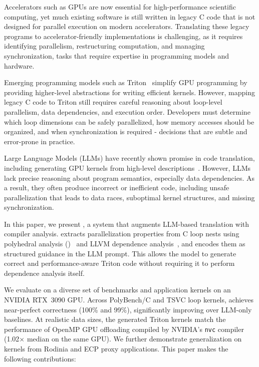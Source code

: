 \documentclass[sigconf]{acmart}
\begin{document}
Accelerators such as GPUs are now essential for high-performance scientific computing, yet much existing software is still written in legacy C code that is not designed for parallel execution on modern accelerators. Translating these legacy programs to accelerator-friendly implementations is challenging, as it requires identifying parallelism, restructuring computation, and managing synchronization, tasks that require expertise in programming models and hardware.


Emerging programming models such as Triton~\cite{tillet2019triton} simplify GPU programming by providing higher-level abstractions for writing efficient kernels. However, mapping legacy C code to Triton still requires careful reasoning about loop-level parallelism, data dependencies, and execution order. Developers must determine which loop dimensions can be safely parallelized, how memory accesses should be organized, and when synchronization is required - decisions that are subtle and error-prone in practice.


Large Language Models (LLMs) have recently shown promise in code translation, including generating GPU kernels from high-level descriptions~\cite{chen2024chatgpt, ouyang2024kernelbench}. However, LLMs lack precise reasoning about program semantics, especially data dependencies. As a result, they often produce incorrect or inefficient code, including unsafe parallelization that leads to data races, suboptimal kernel structures, and missing synchronization.


In this paper, we present \sysname, a system that augments LLM-based translation with compiler analysis. \sysname extracts parallelization properties from C loop nests using polyhedral analysis (\pet)~\cite{verdoolaege2012polyhedral} and LLVM dependence analysis~\cite{llvm}, and encodes them as structured guidance in the LLM prompt. This allows the model to generate correct and performance-aware Triton code without requiring it to perform dependence analysis itself. 

We evaluate \sysname on a diverse set of benchmarks and application kernels on an NVIDIA RTX~3090 GPU. Across PolyBench/C and TSVC loop kernels, \sysname achieves near-perfect correctness (100\% and 99\%), significantly improving over LLM-only baselines. At realistic data sizes, the generated Triton kernels match the performance of OpenMP GPU offloading compiled by NVIDIA's \texttt{nvc} compiler (1.02$\times$ median on the same GPU). We further demonstrate generalization on kernels from Rodinia and ECP proxy applications. This paper makes the following contributions:
\end{document}
